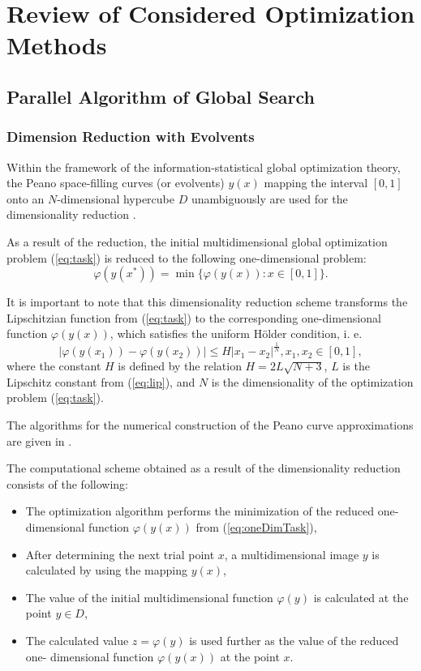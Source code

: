 \documentclass{svproc}
\begin{document}
\section{Review of Considered Optimization Methods}

\subsection{Parallel Algorithm of Global Search}
\subsubsection{Dimension Reduction with Evolvents}
Within the framework of the information-statistical global optimization theory,
the Peano space-filling curves (or evolvents) \(y(x)\) mapping the interval \([0,1]\)
onto an \(N\)-dimensional hypercube \(D\) unambiguously are used for the dimensionality
reduction \cite{sergeyevStronginLera2013, strongin1978, strSergGO}.
\par
As a result of the reduction, the initial multidimensional global optimization
problem (\ref{eq:task}) is reduced to the following one-dimensional problem:
\begin{equation}
\label{eq:oneDimTask}
\varphi(y(x^*))=\min\{\varphi(y(x)):x\in [0,1]\}.
\end{equation}
\par
It is important to note that this dimensionality reduction scheme transforms the %
Lipschitzian function from (\ref{eq:task}) to the corresponding one-dimensional
function \(\varphi(y(x))\), which satisfies the uniform H{\"o}lder condition, i. e.
\begin{equation}
\label{eq:holder}
|\varphi(y(x_1))-\varphi(y(x_2))|\leq H{|x_1-x_2|}^{\frac{1}{N}}, x_1,x_2\in[0,1],
\end{equation}
where the constant $H$ is defined by the relation \(H=2L\sqrt{N+3}\), \(L\) is the Lipschitz
constant from (\ref{eq:lip}), and \(N\) is the dimensionality of the optimization problem
(\ref{eq:task}).
\par
The algorithms for the numerical construction of the Peano curve approximations are
given in \cite{strSergGO}.

\par
The computational scheme obtained as a result of the dimensionality reduction consists of the
following:
\begin{itemize}
  \item The optimization algorithm performs the minimization of the reduced one-dimensional
  function \(\varphi(y(x))\) from (\ref{eq:oneDimTask}),
  \item After determining the next trial point \(x\), a multidimensional image \(y\) is calculated by
using the mapping \(y(x)\),
  \item The value of the initial multidimensional function \(\varphi(y)\) is calculated at the point
\(y\in D\),
  \item The calculated value \(z=\varphi(y)\) is used further as the value of the reduced one-
dimensional function \(\varphi(y(x))\) at the point \(x\).
\end{itemize}
\end{document}
